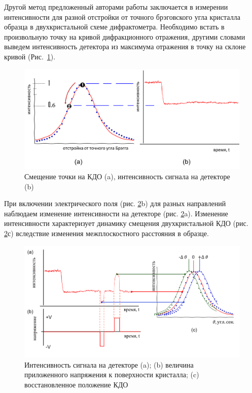 Другой метод предложенный авторами работы \cite{piezo50} заключается в измерении интенсивности для разной
отстройки от точного брэговского угла кристалла образца в двухкристальной схеме дифрактометра.
Необходимо  встать в произвольную точку на кривой дифракционного отражения,
другими словами выведем интенсивность детектора из максимума отражения в точку на склоне
 кривой (Рис.~\ref{ris:kdopiez}).

\begin{figure}[H]
\centering
\includegraphics[width=1\linewidth]{images/kdopiez2.png}
\caption{Смещение точки на КДО (a), интенсивность сигнала на детекторе (b)}
\label{ris:kdopiez}
\end{figure}

При включении электрического поля (рис. \ref{ris:princip}b) для разных направлений наблюдаем изменение интенсивности
на детекторе (рис. \ref{ris:princip}a). Изменение интенсивности характеризует динамику смещения
двухкристальной КДО (рис. \ref{ris:princip}с) вследствие изменения межплоскостного расстояния в образце.

\begin{figure}[H]
\centering
\includegraphics[width=0.8\linewidth]{images/princip2.png}
\caption{Интенсивность сигнала на детекторе (a); (b) величина  приложенного напряжения к
поверхности кристалла; (c) восстановленное положение КДО  }
\label{ris:princip}
\end{figure}

